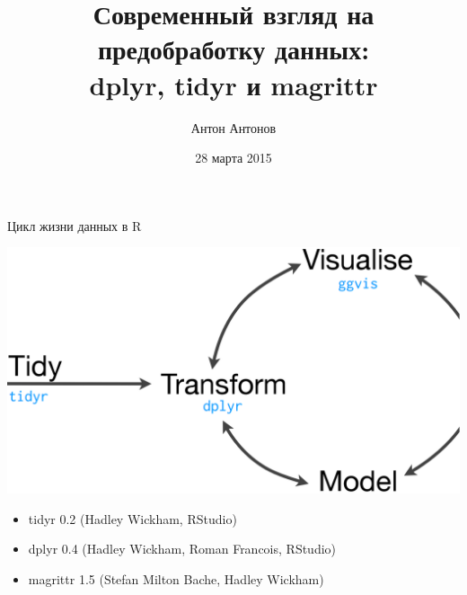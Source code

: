 \documentclass[compress, ucs]{beamer}\usepackage[]{graphicx}\usepackage[]{color}
\begin{document}
\title[dplyr/tidyr/magrittr]{\normalsize Современный взгляд на предобработку данных: \\
dplyr, tidyr и magrittr}
\author{Антон Антонов}
\date{28 марта 2015}
\maketitle
\begin{frame}[fragile]{Цикл жизни данных в R}
\begin{center}
\includegraphics[width=\linewidth]{cycle}
\end{center}
\pause
\begin{itemize}
\item tidyr 0.2 (Hadley Wickham, RStudio)
\item dplyr 0.4 (Hadley Wickham, Roman Francois, RStudio)
\item magrittr 1.5 (Stefan Milton Bache, Hadley Wickham)
\end{itemize}
\end{frame}
\end{document}
